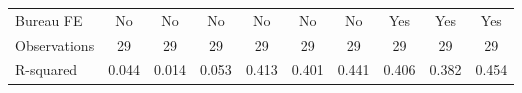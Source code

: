 {\begin{tabular}{l*{9}{c}}
Bureau FE   &          No         &          No         &          No         &          No         &          No         &          No         &         Yes         &         Yes         &         Yes         \\
Observations&          29         &          29         &          29         &          29         &          29         &          29         &          29         &          29         &          29         \\
R-squared   &       0.044         &       0.014         &       0.053         &       0.413         &       0.401         &       0.441         &       0.406         &       0.382         &       0.454         \\
\bottomrule
\end{tabular}
}
